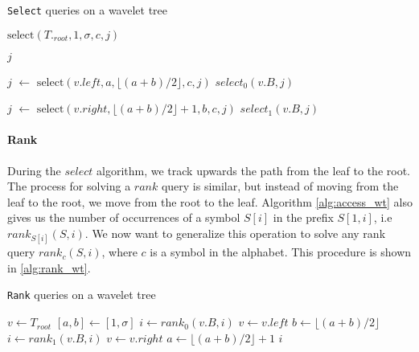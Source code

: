 \begin{algorithm}
    \caption{\texttt{Select} queries on a wavelet tree}\label{alg:select_wt}
    \begin{algorithmic}

        \State \Return $\text{select}(T._{root},1, \sigma, c, j)$
        \EndFunction

        \vspace{0.4cm}

        \State \Return $j$
        \EndIf

        \State $j$ $\gets$ $\text{select}(v.left, a, \lfloor (a+b)/2 \rfloor, c, j)$
        \Return $select_0(v.B,j)$

        \Else
        \State $j$ $\gets$ $\text{select}(v.right, \lfloor (a+b)/2 \rfloor +1, b, c, j)$
        \State \Return $select_1(v.B,j)$
        \EndIf

        \EndFunction

    \end{algorithmic}
\end{algorithm}

\paragraph{Rank} During the $select$ algorithm, we track upwards the path from the leaf to the root. The process for solving a $rank$ query is similar, but instead of moving from the leaf to the root, we move from the root to the leaf. Algorithm \ref{alg:access_wt} also gives us the number of occurrences of a symbol $S[i]$ in the prefix $S[1,i]$, i.e $rank_{S[i]}(S,i)$. We now want to generalize this operation to solve any rank query $rank_c(S,i)$, where $c$ is a symbol in the alphabet. This procedure is shown in \ref{alg:rank_wt}.
\begin{algorithm}[h!]
    \caption{\texttt{Rank} queries on a wavelet tree}\label{alg:rank_wt}
    \begin{algorithmic}
        \State $v \gets T_{root}$ 
        \State $[a,b] \gets [1,\sigma]$
        \State $i \gets rank_0(v.B,i)$
        \State $v \gets v.left$ 
        \State $b \gets \lfloor (a+b)/2 \rfloor$
        \Else
        \State $i \gets rank_1(v.B,i)$
        \State $v \gets v.right$ 
        \State $a \gets \lfloor (a+b)/2 \rfloor +1$
        \EndIf
        \EndWhile
        \State \Return $i$
        \EndFunction
    \end{algorithmic}

\end{algorithm}


